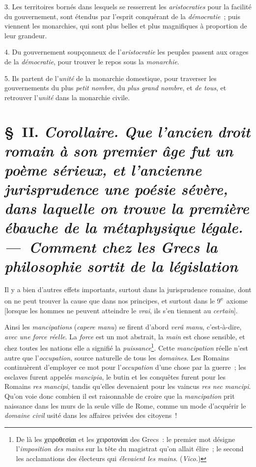 \documentclass[french,twoside]{book} %
\begin{document}
3. Les territoires bornés dans lesquels se resserrent les {\itshape aristocraties} pour la facilité du gouvernement, sont étendus par l’esprit conquérant de la {\itshape démocratie} ; puis viennent les monarchies, qui sont plus belles et plus magnifiques à proportion de leur grandeur.\par
4. Du gouvernement soupçonneux de l’{\itshape aristocratie} les peuples passent aux orages de la {\itshape démocratie}, pour trouver le repos sous la {\itshape monarchie}.\par
5. Ils partent de l’{\itshape unité} de la monarchie domestique, pour traverser les gouvernements du plus {\itshape petit nombre}, du {\itshape plus grand nombre}, et {\itshape de tous}, et retrouver l’{\itshape unité} dans la monarchie civile.
\section[{§ II. Corollaire. Que l’ancien droit romain à son premier âge fut un poème sérieux, et l’ancienne jurisprudence une poésie sévère, dans laquelle on trouve la première ébauche de la métaphysique légale. — Comment chez les Grecs la philosophie sortit de la législation}]{§ II. {\itshape Corollaire. Que l’ancien droit romain à son premier âge fut un poème sérieux, et l’ancienne jurisprudence une poésie sévère, dans laquelle on trouve la première ébauche de la métaphysique légale. — Comment chez les Grecs la philosophie sortit de la législation}}
\noindent Il y a bien d’autres effets importants, surtout dans  la jurisprudence romaine, dont on ne peut trouver la cause que dans nos principes, et surtout dans le 9\textsuperscript{e} axiome [lorsque les hommes ne peuvent atteindre le {\itshape vrai}, ils s’en tiennent au {\itshape certain}].\par
Ainsi les {\itshape mancipations} ({\itshape capere manu}) se firent d’abord {\itshape verâ manu}, c’est-à-dire, {\itshape avec une force réelle}. La {\itshape force} est un mot abstrait, la {\itshape main} est chose sensible, et chez toutes les nations elle a signifié la {\itshape puissance}\footnote{De là les χειροθεσίαι et les χειροτονίαι des Grecs : le premier mot désigne l’{\itshape imposition des mains} sur la tête du magistrat qu’on allait élire ; le second les acclamations des électeurs qui {\itshape élevaient les mains}. ({\itshape Vico.})}. Cette {\itshape mancipation} réelle n’est autre que l’{\itshape occupation}, source naturelle de tous les {\itshape domaines}. Les Romains continuèrent d’employer ce mot pour l’{\itshape occupation} d’une chose par la guerre ; les esclaves furent appelés {\itshape mancipia}, le butin et les conquêtes furent pour les Romains {\itshape res mancipi}, tandis qu’elles devenaient pour les vaincus {\itshape res nec mancipi}. Qu’on voie donc combien il est raisonnable de croire que la {\itshape mancipation} prit naissance dans les murs de la seule ville de Rome, comme un mode d’acquérir le {\itshape domaine civil} usité dans les affaires privées des citoyens !\par
\end{document}
